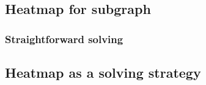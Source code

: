









\subsection{Heatmap for subgraph}

\subsubsection{Straightforward solving}





\subsection{Heatmap as a solving strategy}


